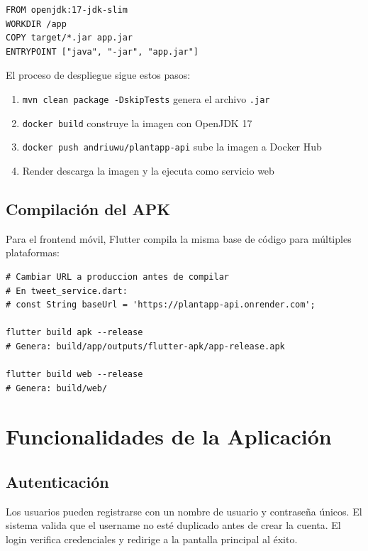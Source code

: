 \documentclass[12pt,a4paper]{article}
\begin{document}
\begin{lstlisting}[style=propsstyle, caption=Dockerfile del backend]
FROM openjdk:17-jdk-slim
WORKDIR /app
COPY target/*.jar app.jar
ENTRYPOINT ["java", "-jar", "app.jar"]
\end{lstlisting}

El proceso de despliegue sigue estos pasos:

\begin{enumerate}
  \item \texttt{mvn clean package -DskipTests} genera el archivo \texttt{.jar}
  \item \texttt{docker build} construye la imagen con OpenJDK 17
  \item \texttt{docker push andriuwu/plantapp-api} sube la imagen a Docker Hub
  \item Render descarga la imagen y la ejecuta como servicio web
\end{enumerate}

\subsection{Compilación del APK}

Para el frontend móvil, Flutter compila la misma base de código para múltiples plataformas:

\begin{lstlisting}[style=propsstyle, caption=Comandos de compilación Flutter]
# Cambiar URL a produccion antes de compilar
# En tweet_service.dart:
# const String baseUrl = 'https://plantapp-api.onrender.com';

flutter build apk --release
# Genera: build/app/outputs/flutter-apk/app-release.apk

flutter build web --release
# Genera: build/web/
\end{lstlisting}


\section{Funcionalidades de la Aplicación}

\subsection{Autenticación}

Los usuarios pueden registrarse con un nombre de usuario y contraseña únicos. El sistema valida que el username no esté duplicado antes de crear la cuenta. El login verifica credenciales y redirige a la pantalla principal al éxito.
\end{document}
